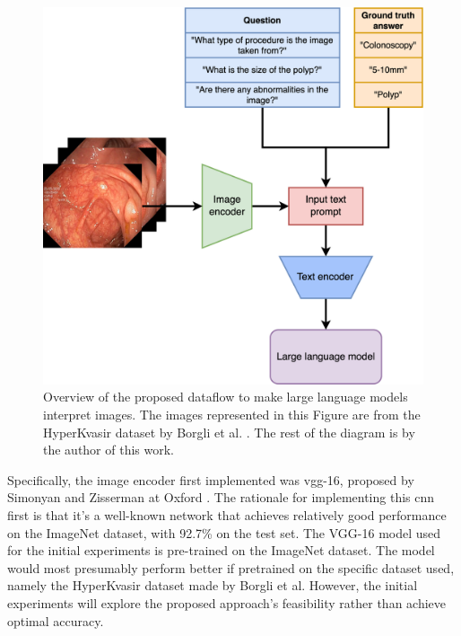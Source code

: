         \begin{figure}[htb]
            \centerline{
            \includegraphics[width=\textwidth]{images/alpaca_vision.png}}
            \caption[Overview of the proposed dataflow to make large language models interpret images.]{Overview of the proposed dataflow to make large language models interpret images. The images represented in this Figure are from the HyperKvasir dataset by Borgli et al. \cite{borgliHyperKvasirComprehensiveMulticlass2020}. The rest of the diagram is by the author of this work.}
            \label{fig:alpaca_vision}
        \end{figure}


        Specifically, the image encoder first implemented was \gls{vgg}-16, proposed by Simonyan and Zisserman at Oxford \cite{simonyanVeryDeepConvolutional2015}. The rationale for implementing this \gls{cnn} first is that it’s a well-known network that achieves relatively good performance on the ImageNet dataset, with 92.7\% on the test set. The VGG-16 model used for the initial experiments is pre-trained on the ImageNet \cite{dengImageNetLargeScaleHierarchical2009} dataset. The model would most presumably perform better if pretrained on the specific dataset used, namely the HyperKvasir dataset \cite{borgliHyperKvasirComprehensiveMulticlass2020} made by Borgli et al. However, the initial experiments will explore the proposed approach's feasibility rather than achieve optimal accuracy.

